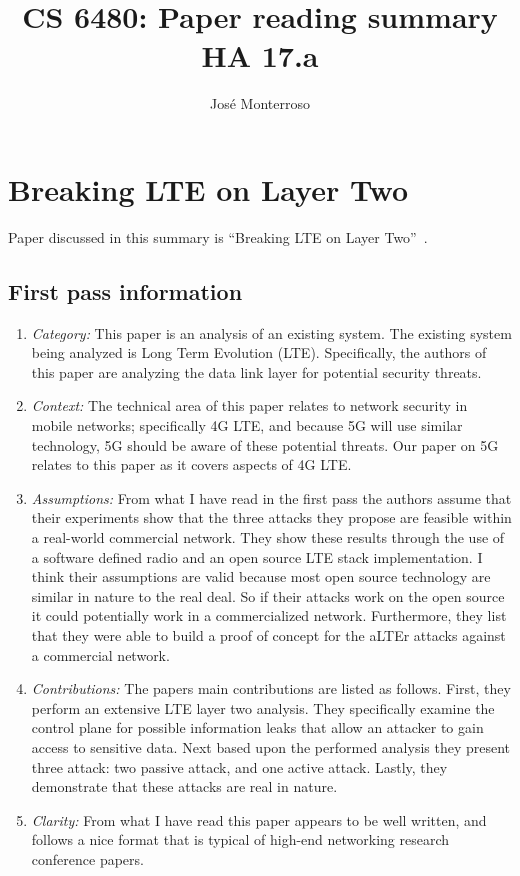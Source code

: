 \documentclass[letterpaper,twocolumn,10pt]{article}
\title{CS 6480: Paper reading summary\\
HA 17.a\\}
\author{José Monterroso}
\affil{School of Computing, University of Utah}
\begin{document}
\maketitle
\section{Breaking LTE on Layer Two}

Paper discussed in this summary is ``Breaking LTE on Layer Two''~\cite{breakinglte}.

\subsection{First pass information}
\label{sec:first}

\begin{enumerate}

\item {\it Category:}
This paper is an analysis of an existing system. The existing system being analyzed is Long Term Evolution (LTE).
Specifically, the authors of this paper are analyzing the data link layer for potential security threats.

\item {\it Context:} 
The technical area of this paper relates to network security in mobile networks; specifically 4G LTE, and because 
5G will use similar technology, 5G should be aware of these potential threats. Our paper on 5G~\cite{5gwhite}
relates to this paper as it covers aspects of 4G LTE. 

\item {\it Assumptions:}  
From what I have read in the first pass the authors assume that their experiments show that the three attacks
they propose are feasible within a real-world commercial network. They show these results through
the use of a software defined radio and an open source LTE stack implementation. I think their assumptions are 
valid because most open source technology are similar in nature to the real deal. So if their attacks work on the 
open source it could potentially work in a commercialized network. Furthermore, they list that they were able to 
build a proof of concept for the aLTEr attacks against a commercial network. 

\item {\it Contributions:} 
The papers main contributions are listed as follows. First, they perform an extensive LTE layer two analysis. They
specifically examine the control plane for possible information leaks that allow an attacker to gain access to 
sensitive data. Next based upon the performed analysis they present three attack: two passive attack, and one 
active attack. Lastly, they demonstrate that these attacks are real in nature.

\item {\it Clarity:} From what I have read this paper appears to be well written, and follows a nice format that 
is typical of high-end networking research conference papers.

\end{enumerate}
\end{document}
